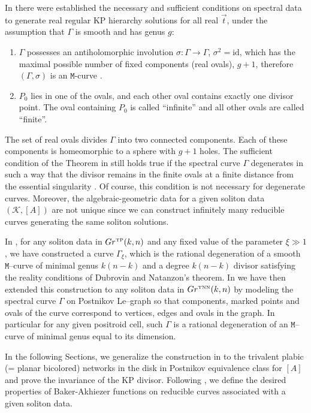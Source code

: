 \documentclass[11pt]{amsart}
\theoremstyle{plain}
\numberwithin{equation}{section}
\def \GTNN {{Gr^{\mbox{\tiny TNN}} (k,n)}}
\def \GTP {{Gr^{\mbox{\tiny TP}} (k,n)}}
\begin{document}
In \cite{DN} there were established the necessary and sufficient conditions on spectral data to generate real regular KP hierarchy solutions for all real $\vec t$, under the assumption that $\Gamma$ is smooth and has genus $g$: 
\begin{enumerate}
\item $\Gamma$ possesses an antiholomorphic involution ${\sigma}:\Gamma\rightarrow\Gamma$, ${\sigma}^2=\mbox{id}$, which has the maximal possible number of fixed components (real ovals), $g+1$, therefore $(\Gamma,\sigma)$ is an $\mathtt M$-curve \cite{Har,Nat,Vi}.
\item $P_0$ lies in one of the ovals, and each other oval contains exactly one divisor point. The oval containing $P_0$ is called ``infinite'' and all 
other ovals are called ``finite''.
\end{enumerate}

The set of real ovals divides $\Gamma$ into two connected components. Each of these components is homeomorphic to a sphere with $g+1$ holes. 
The sufficient condition of the Theorem in \cite{DN} still holds true if the spectral curve $\Gamma$ degenerates in such a way that the divisor remains in the finite ovals 
at a finite distance from the essential singularity \cite{DN}. Of course, this condition is not necessary for degenerate curves. 
Moreover, the algebraic-geometric data for a given soliton data $({\mathcal K},[A])$ are not unique since we can construct 
infinitely many reducible curves generating the same soliton solutions. 

\smallskip

In \cite{AG1}, for any soliton data in $\GTP$ and any fixed value of the  parameter $\xi\gg 1$, we have constructed a curve $\Gamma_{\xi}$, which is the rational degeneration of 
a smooth $\mathtt M$--curve of minimal genus $k(n-k)$ and a degree $k(n-k)$ divisor satisfying the reality conditions of Dubrovin and Natanzon's theorem. 
In \cite{AG3} we have then extended this construction to any soliton data in $\GTNN$ by modeling the spectral curve $\Gamma$ on Postnikov Le--graph so that components, marked points and ovals of the curve correspond to vertices, edges and ovals in the graph. In particular for any given positroid cell, such $\Gamma$ is a rational degeneration of an $\mathtt M$--curve of minimal genus equal to its dimension.

In the following Sections, we generalize the construction in \cite{AG3} to the trivalent plabic (= planar bicolored) networks in the disk in Postnikov equivalence class for $[A]$ and prove the invariance of the KP divisor.
Following \cite{AG3}, we define the desired properties of Baker-Akhiezer functions on reducible curves associated with a given soliton data. 
\end{document}
